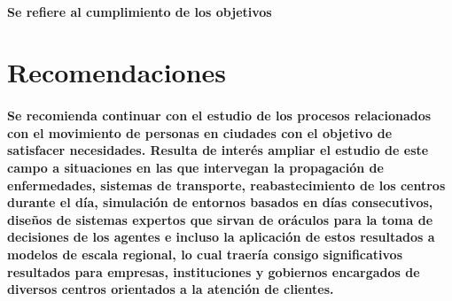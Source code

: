 \documentclass[12pt]{amsart}
\begin{document}
\paragraph{Se refiere al cumplimiento de los objetivos}

\section{Recomendaciones}

\paragraph{Se recomienda continuar con el estudio de los procesos relacionados con el movimiento de personas en ciudades con el objetivo de satisfacer necesidades. Resulta de interés ampliar el estudio de este campo a situaciones en las que intervegan la propagación de enfermedades, sistemas de transporte, reabastecimiento de los centros durante el día, simulación de entornos basados en días consecutivos, diseños de sistemas expertos que sirvan de oráculos para la toma de decisiones de los agentes e incluso la aplicación de estos resultados a modelos de escala regional, lo cual traería consigo significativos resultados para empresas, instituciones y gobiernos encargados de diversos centros orientados a la atención de clientes.}
\end{document}
